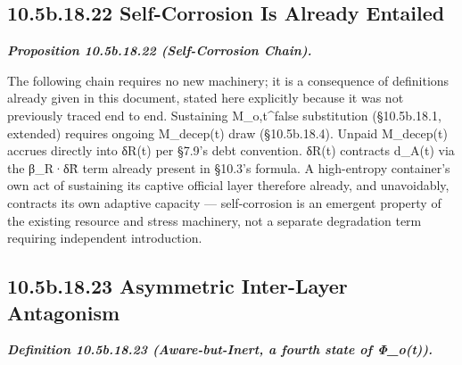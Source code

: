 \documentclass[
]{article}
\begin{document}
\hypertarget{b.18.22-self-corrosion-is-already-entailed}{%
\subsection{10.5b.18.22 Self-Corrosion Is Already
Entailed}\label{b.18.22-self-corrosion-is-already-entailed}}

\emph{\textbf{Proposition 10.5b.18.22 (Self-Corrosion Chain).}}

The following chain requires no new machinery; it is a consequence of
definitions already given in this document, stated here explicitly
because it was not previously traced end to end. Sustaining
M\_o,t\^{}false substitution (§10.5b.18.1, extended) requires ongoing
M\_decep(t) draw (§10.5b.18.4). Unpaid M\_decep(t) accrues directly into
δR(t) per §7.9's debt convention. δR(t) contracts d\_A(t) via the
β\_R·δR̃ term already present in §10.3's formula. A high-entropy
container's own act of sustaining its captive official layer therefore
already, and unavoidably, contracts its own adaptive capacity ---
self-corrosion is an emergent property of the existing resource and
stress machinery, not a separate degradation term requiring independent
introduction.

\hypertarget{b.18.23-asymmetric-inter-layer-antagonism}{%
\subsection{10.5b.18.23 Asymmetric Inter-Layer
Antagonism}\label{b.18.23-asymmetric-inter-layer-antagonism}}

\emph{\textbf{Definition 10.5b.18.23 (Aware-but-Inert, a fourth state of
Φ\_o(t)).}}
\end{document}
